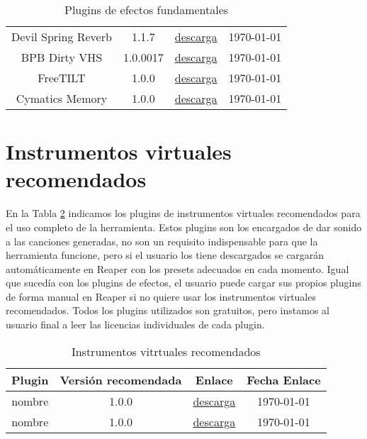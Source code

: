 \begin{table}[h]
\begin{tabular}{c|c|c|c}
            Devil Spring Reverb & 1.1.7 & \href{https://plugins4free.com/plugin/3216/}{descarga} & \today\\
            
            BPB Dirty VHS & 1.0.0017 & \href{https://bedroomproducersblog.com/free-vst-plugins/bpb-dirty-vhs/}{descarga} & \today\\
            
            FreeTILT & 1.0.0 & \href{https://plugins4free.com/plugin/3743/}{descarga} & \today\\
            
            Cymatics Memory & 1.0.0 & \href{https://cymatics.fm/collections/plugins/products/memory-plugin}{descarga} & \today\\
            
		\hline
	\end{tabular}
	\caption{Plugins de efectos fundamentales}
	\label{tab:plugins-efectos-fundamentales}
\end{table}


\section{Instrumentos virtuales recomendados}

En la Tabla \ref{tab:instrumentos-virtuales-recomendados} indicamos los plugins de instrumentos virtuales recomendados para el uso completo de la herramienta. Estos plugins son los encargados de dar sonido a las canciones generadas, no son un requisito indispensable para que la herramienta funcione, pero si el usuario los tiene descargados se cargarán automáticamente en Reaper con los presets adecuados en cada momento. Igual que sucedía con los plugins de efectos, el usuario puede cargar sus propios plugins de forma manual en Reaper si no quiere usar los instrumentos virtuales recomendados. Todos los plugins utilizados son gratuitos, pero instamos al usuario final a leer las licencias individuales de cada plugin.

\begin{table}[h]
    \centering
	\begin{tabular}{c|c|c|c}
		\textbf{Plugin} & \textbf{Versión recomendada} & \textbf{Enlace} & \textbf{Fecha Enlace} \\
		\hline\hline
		
            nombre & 1.0.0 & \href{https://plugins4free.com/plugin/3743/}{descarga} & \today\\
            
            nombre & 1.0.0 & \href{https://cymatics.fm/collections/plugins/products/memory-plugin}{descarga} & \today\\
            
		\hline
	\end{tabular}
	\caption{Instrumentos vitrtuales recomendados}
	\label{tab:instrumentos-virtuales-recomendados}
\end{table}
